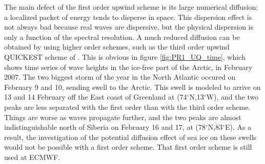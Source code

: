 The main defect of the first order upwind scheme is its large numerical diffusion: a localized packet of energy tends to disperse in space. This 
dispersion effect is not always bad because real waves are dispersive, but the physical dispersion is only a function of the spectral resolution. 
A much reduced diffusion can be obtained by using higher order schemes, such as the third order upwind QUICKEST scheme of \cite{Leonard1991}.
This is obvious in figure \ref{fig:PR1_UQ_time}, which shows time series of wave heights
in the ice-free part of the Arctic, in February 2007. The two biggest storm of the year in the North Atlantic occured on February 9 and 10, 
sending swell to the Arctic. This swell is modeled to arrive on 13 and 14 February off the East coast of Greenland at (74$^\circ$N,13$^\circ$W), 
and the two peaks are less separated with the first order than with the third order scheme. Things are worse as waves propagate further, and the 
two peaks are almost indistinguishable north of Siberia on February 16 and 17, at (78$^\circ$N,83$^\circ$E). As a result, the investigation of the potential diffusion 
effect of sea ice on these swells \citep{Ardhuin&al.2016} would not be possible with a first order scheme. That first order scheme is still used 
at ECMWF. 


